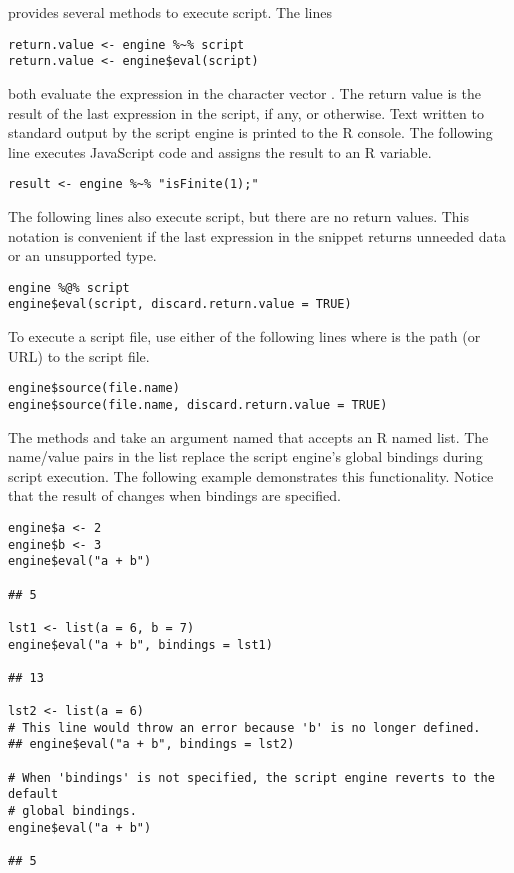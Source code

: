  provides several methods to execute script. The lines

\begin{verbatim}
return.value <- engine %~% script
return.value <- engine$eval(script)
\end{verbatim}

\noindent both evaluate the expression in the character vector . The return value is the result of the last expression in the script, if any, or  otherwise. Text written to standard output by the script engine is printed to the R console. The following line executes JavaScript code and assigns the result to an R variable.

\begin{verbatim}
result <- engine %~% "isFinite(1);"
\end{verbatim}

The following lines also execute script, but there are no return values. This notation is convenient if the last expression in the snippet returns unneeded data or an unsupported type.

\begin{verbatim}
engine %@% script
engine$eval(script, discard.return.value = TRUE)
\end{verbatim}

\noindent To execute a script file, use either of the following lines where  is the path (or URL) to the script file.

\begin{verbatim}
engine$source(file.name)
engine$source(file.name, discard.return.value = TRUE)
\end{verbatim}

The methods  and  take an argument named  that accepts an R named list. The name/value pairs in the list replace the script engine's global bindings during script execution. The following example demonstrates this functionality. Notice that the result of  changes when bindings are specified.

\begin{verbatim}
engine$a <- 2
engine$b <- 3
engine$eval("a + b")

## 5

lst1 <- list(a = 6, b = 7)
engine$eval("a + b", bindings = lst1)

## 13

lst2 <- list(a = 6)
# This line would throw an error because 'b' is no longer defined.
## engine$eval("a + b", bindings = lst2)

# When 'bindings' is not specified, the script engine reverts to the default
# global bindings.
engine$eval("a + b")

## 5
\end{verbatim}

